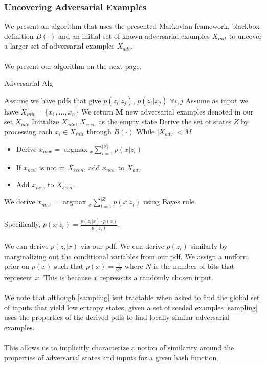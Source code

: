 \documentclass[letterpaper,twocolumn,10pt]{article}
\begin{document}
\subsubsection{Uncovering Adversarial Examples}
We present an algorithm that uses the presented Markovian framework, blackbox definition $B(\cdot)$ and an initial set of known adversarial examples $X_{init}$ to uncover a larger set of adversarial examples $X_{adv}$. 
\\
\\
We present our algorithm on the next page. 

\begin{algorithm} \label{alg:adv}
\caption{Adversarial Alg}\label{sampling}
\begin{algorithmic}[1]
\State Assume we have pdfs that give $p(z_{i} | z_{j})$, $p(z_{i} | x_{j})$ $\forall i,j$
\State Assume as input we have $X_{init} = \{x_{1}, ..., x_{n}\}$
\State We return \textbf{M} new adversarial examples denoted in our set $X_{adv}$
\State Initialize $X_{adv}$, $X_{seen}$ as the empty state
\State Derive the set of states $Z$ by processing each $x_{i} \in X_{init}$ through $B(\cdot)$
\State While $|X_{adv} | < M$
\begin{itemize}
\item Derive $x_{new} =$ argmax $_{x} \sum_{i=1}^{|Z|} p(x | z_{i})$
\item If $x_{new}$ is not in $X_{seen}$, add $x_{new}$ to $X_{adv}$
\item Add $x_{new}$ to $X_{seen}$.
\end{itemize}
\end{algorithmic}
\end{algorithm}

We derive $x_{new} =$ argmax $_{x} \sum_{i=1}^{|Z|} p(x | z_{i})$ using Bayes rule. 
\\
\\
Specifically, $p(x | z_{i}) = \frac{p(z_{i} | x) \cdot p(x)}{p(z_{i})}$. 
\\
\\
We can derive $p(z_{i} | x)$ via our pdf. We can derive $p(z_{i})$ similarly by marginalizing out the conditional variables from our pdf. We assign a uniform prior on $p(x)$ such that $p(x) = \frac{1}{2^{N}}$ where $N$ is the number of bits that represent $x$. This is because $x$ represents a randomly chosen input.
\\
\\
We note that although \ref{sampling} isnt tractable when asked to find the global set of inputs that yield low entropy states, given a set of seeded examples \ref{sampling} uses the properties of the derived pdfs to find locally similar adversarial examples. 
\\
\\
This allows us to implicitly characterize a notion of similarity around the properties of adversarial states and inputs for a given hash function. 
\end{document}
